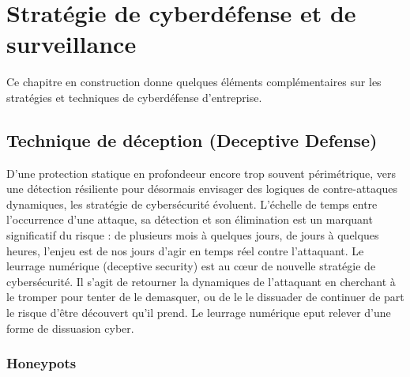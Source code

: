 
\section{Stratégie de cyberdéfense et de surveillance}

Ce chapitre en construction donne quelques éléments complémentaires sur les stratégies et techniques de cyberdéfense d'entreprise. 


\subsection{Technique de déception (Deceptive Defense)}

 D'une protection statique en profondeeur encore trop souvent périmétrique, vers une détection résiliente pour désormais envisager des logiques de contre-attaques dynamiques, les stratégie de cybersécurité évoluent. L'échelle de temps entre l'occurrence d'une attaque, sa détection et son élimination est un marquant significatif du risque : de plusieurs mois à quelques jours,  de jours à quelques heures, l'enjeu est  de nos jours  d'agir en temps réel contre l'attaquant. 
 Le leurrage numérique (deceptive security) est au cœur de nouvelle stratégie de  cybersécurité. Il s'agit de retourner la dynamiques  de l'attaquant en cherchant à le tromper pour tenter de le demasquer, ou de le le dissuader de continuer de part le risque d'être découvert qu'il prend. Le leurrage numérique eput relever d'une forme de dissuasion cyber.

\subsubsection{Honeypots}

